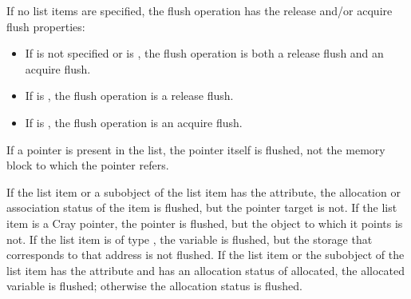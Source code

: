 If no list items are specified, the flush operation has the release and/or
acquire flush properties:

\begin{itemize}
\item If  is not specified or is , the flush operation
is both a release flush and an acquire flush.

\item If  is , the flush operation is a release flush.

\item If  is , the flush operation is an acquire flush.
\end{itemize}

\begin{ccppspecific}
If a pointer is present in the list, the pointer itself is flushed, not the memory block to
which the pointer refers.
\end{ccppspecific}

\begin{fortranspecific}
If the list item or a subobject of the list item has the  attribute, the allocation
or association status of the  item is flushed, but the pointer target is not. If the
list item is a Cray pointer, the pointer is flushed, but the object to which it points is not.
If the list item is of type , the variable is flushed, but the storage that corresponds
to that address is not flushed. If the list item or the subobject of the list item has the
 attribute and has an allocation status of allocated, the
allocated variable is flushed; otherwise the allocation status is flushed.
\end{fortranspecific}

